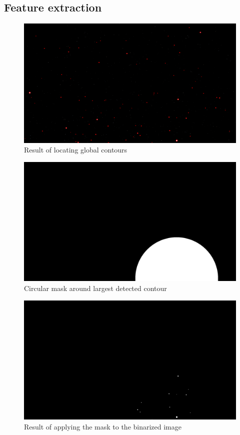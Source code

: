 \documentclass[10pt,twocolumn,letterpaper]{article}
\begin{document}
\subsection{Feature extraction}

\begin{figure}[H]
  \centering
   \includegraphics[width=0.9\linewidth]{all_contours}
   \caption{Result of locating global contours}
   \label{fig:star_contours}
\end{figure}

\begin{figure}[H]
  \centering
   \includegraphics[width=0.9\linewidth]{mask}
   \caption{Circular mask around largest detected contour}
   \label{fig:star_mask}
\end{figure}

\begin{figure}[H]
  \centering
   \includegraphics[width=0.9\linewidth]{masked}
   \caption{Result of applying the mask to the binarized image}
   \label{fig:star_masked}
\end{figure}
\end{document}
